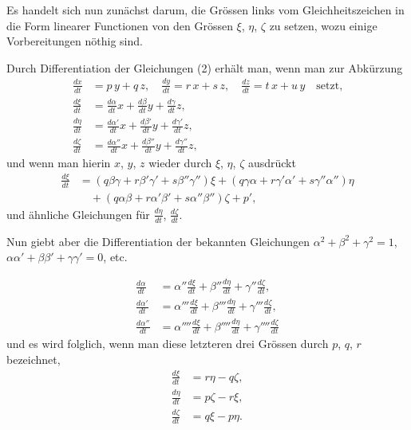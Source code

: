 \documentclass[12pt,a4paper]{article}
\begin{document}
Es handelt sich nun zun\"achst darum, die Gr\"ossen links vom Gleichheitszeichen in die Form linearer Functionen von den Gr\"ossen $\xi$, $\eta$, $\zeta$ zu setzen, wozu einige Vorbereitungen n\"othig sind.

Durch Differentiation der Gleichungen (2) erh\"alt man, wenn man zur Abk\"urzung
\begin{align*}
\frac{dx}{dt} &= p\,y + q\,z,\quad \frac{dy}{dt} = r\,x + s\,z,\quad \frac{dz}{dt} = t\,x + u\,y\quad\text{setzt,}\\
\frac{d\xi}{dt} &= \frac{d\alpha}{dt}x + \frac{d\beta}{dt}y + \frac{d\gamma}{dt}z,\\
\frac{d\eta}{dt} &= \frac{d\alpha'}{dt}x + \frac{d\beta'}{dt}y + \frac{d\gamma'}{dt}z,\\
\frac{d\zeta}{dt} &= \frac{d\alpha''}{dt}x + \frac{d\beta''}{dt}y + \frac{d\gamma''}{dt}z,\tag{2}
\end{align*}
und wenn man hierin $x$, $y$, $z$ wieder durch $\xi$, $\eta$, $\zeta$ ausdr\"uckt
\begin{align*}
\frac{d\xi}{dt} &= (q\beta\gamma + r\beta'\gamma' + s\beta''\gamma'')\xi + (q\gamma\alpha + r\gamma'\alpha' + s\gamma''\alpha'')\eta\\
&\quad + (q\alpha\beta + r\alpha'\beta' + s\alpha''\beta'')\zeta + p',\tag{3}
\end{align*}
und \"ahnliche Gleichungen f\"ur $\frac{d\eta}{dt}$, $\frac{d\zeta}{dt}$.

Nun giebt aber die Differentiation der bekannten Gleichungen $\alpha^{2} + \beta^{2} + \gamma^{2} = 1$, $\alpha\alpha' + \beta\beta' + \gamma\gamma' = 0$, etc.

\begin{align*}
\frac{d\alpha}{dt} &= \alpha''\frac{d\xi}{dt} + \beta''\frac{d\eta}{dt} + \gamma''\frac{d\zeta}{dt},\\
\frac{d\alpha'}{dt} &= \alpha'''\frac{d\xi}{dt} + \beta'''\frac{d\eta}{dt} + \gamma'''\frac{d\zeta}{dt},\\
\frac{d\alpha''}{dt} &= \alpha''''\frac{d\xi}{dt} + \beta''''\frac{d\eta}{dt} + \gamma''''\frac{d\zeta}{dt}\tag{3}
\end{align*}
und es wird folglich, wenn man diese letzteren drei Gr\"ossen durch $p$, $q$, $r$ bezeichnet,
\begin{align*}
\frac{d\xi}{dt} &= r\eta - q\zeta,\\
\frac{d\eta}{dt} &= p\zeta - r\xi,\\
\frac{d\zeta}{dt} &= q\xi - p\eta.\tag{4}
\end{align*}
\end{document}
